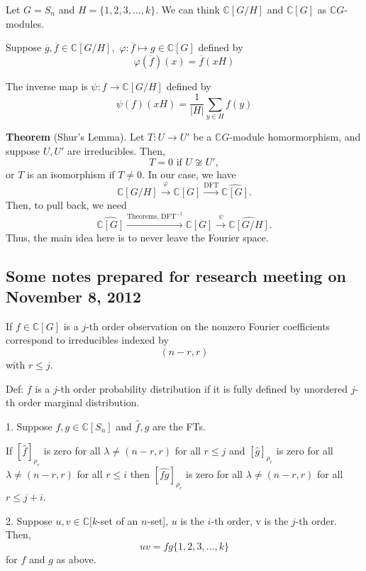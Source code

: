 \documentclass[10pt,reqno]{amsart}
\renewcommand{\phi}{\varphi}
\newcommand{\C}{\mathbb{C}}
\theoremstyle{definition}
\numberwithin{equation}{section}
\begin{document}
Let $G = S_n$ and $H = \{1,2,3,\ldots, k\}.$
We can think $\C[G/H]$ and $\C[G]$
as $\C G$-modules.

Suppose $\overline{g}, \overline{f}\in \C[G/H],$
$\phi:\overline{f}\mapsto g\in \C[G]$ defined by
\[\phi(\overline{f})(x) = \overline{f}(xH)\]

The inverse map is $\psi:f\to \C[G/H]$ defined by
\[\psi(f)(xH) = \frac{1}{|H|}\sum_{y\in H}f(y)\]

\noindent \textbf{Theorem} (Shur's Lemma).
Let $T:U\to U'$ be a $\C G$-module homormorphism,
and suppose $U,U'$ are irreducibles. Then,
\[T=
0 \text{ if } U\not\cong U',
\]
or $T$ is an isomorphism if $T\neq 0.$
In our case, we have
\begin{equation}
\label{map}
\C[G/H]\xrightarrow{\phi}\C[G]\xrightarrow{\text{DFT}}
\hat{\C[G]}.
\end{equation}
Then, to pull back, we need
\[\hat{\C[G]}\xrightarrow{\text{Theorems, DFT}^{-1}}\C[G]\xrightarrow{\psi}
\hat{\C[G/H]}.\]
Thus, the main idea here is to never leave the Fourier
space.

\subsection{Some notes prepared 
for research meeting on November 8, 2012}
If $f\in \C[G]$ is a $j$-th order observation on
the nonzero Fourier coefficients correspond to
irreducibles indexed by 
\[(n-r, r)\]
with $r\leq j.$

Def: $f$ is a $j$-th order probability distribution
if it is fully defined by unordered $j$-th order marginal distribution.

1. Suppose $f, g\in \C[S_n]$ and $\hat{f}, \hat{g}$ are the FTs.

If $[\hat{f}]_{\rho_r}$ is zero for all
$\lambda\neq (n-r, r)$ for all $r\leq j$
and
$[\hat{g}]_{\rho_r}$ is zero for all
$\lambda\neq (n-r, r)$ for all $r\leq i$
then
$[\hat{fg}]_{\rho_r}$ is zero for all
$\lambda\neq (n-r, r)$ for all $r\leq j + i$.

2. Suppose $u,v \in \C$[$k$-set of an $n$-set],
$u$ is the $i$-th order, v is the $j$-th order.
Then,
\[uv = fg \{1, 2, 3, \ldots, k\}\]
for $f$ and $g$ as above.
\end{document}
